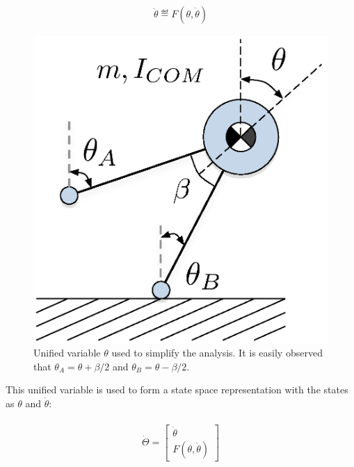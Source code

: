 \begin{equation}  
	\begin{aligned}
		\ddot{\theta} \eqdef F(\theta, \dot{\theta})
	\end{aligned}
\end{equation}

\begin{figure}[!b]
	\centering
    \includegraphics[scale=0.8]{fig/fpe/unifiedstate.eps} 
  	\caption{Unified variable $\theta$ used to simplify the analysis. It is easily observed that $\theta_A = \theta  + \beta /2$ and $\theta_B = \theta  - \beta /2$.}
	\label{fig:unified}
\end{figure}

This unified variable is used to form a state space representation with the states as $\theta$ and $\dot{\theta}$: 

\begin{equation} \label{ss}
	\begin{aligned}
				\begin{gathered}
  			\dot{\Theta} = \left[ {\begin{array}{*{20}{c}}
  {\dot \theta } \\ 
  {F(\theta, \dot{\theta})} 
							   \end{array}} \right]
		\end{gathered}
	\end{aligned}
\end{equation}

